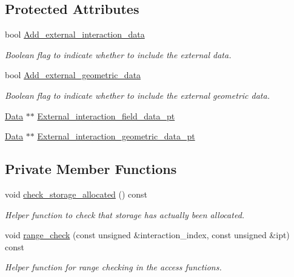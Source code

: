 \subsection*{Protected Attributes}
\begin{DoxyCompactItemize}
\item 
bool \hyperlink{classoomph_1_1ElementWithExternalElement_aba9cc26e0c5dfca9f3b39e7b7105d079}{Add\+\_\+external\+\_\+interaction\+\_\+data}
\begin{DoxyCompactList}\small\item\em Boolean flag to indicate whether to include the external data. \end{DoxyCompactList}\item 
bool \hyperlink{classoomph_1_1ElementWithExternalElement_a9d478d4cc42a922bac86492479c64db1}{Add\+\_\+external\+\_\+geometric\+\_\+data}
\begin{DoxyCompactList}\small\item\em Boolean flag to indicate whether to include the external geometric data. \end{DoxyCompactList}\item 
\hyperlink{classoomph_1_1Data}{Data} $\ast$$\ast$ \hyperlink{classoomph_1_1ElementWithExternalElement_a78e89193aa13a86a88c8b6b16141e194}{External\+\_\+interaction\+\_\+field\+\_\+data\+\_\+pt}
\item 
\hyperlink{classoomph_1_1Data}{Data} $\ast$$\ast$ \hyperlink{classoomph_1_1ElementWithExternalElement_ab72abfc5f23aebc3ea25083be8857c3e}{External\+\_\+interaction\+\_\+geometric\+\_\+data\+\_\+pt}
\end{DoxyCompactItemize}
\subsection*{Private Member Functions}
\begin{DoxyCompactItemize}
\item 
void \hyperlink{classoomph_1_1ElementWithExternalElement_a6fd8c3cb72d4feedeb8750d830f66222}{check\+\_\+storage\+\_\+allocated} () const
\begin{DoxyCompactList}\small\item\em Helper function to check that storage has actually been allocated. \end{DoxyCompactList}\item 
void \hyperlink{classoomph_1_1ElementWithExternalElement_a78d8fa19cbc1279a8aeb1756ce64c0df}{range\+\_\+check} (const unsigned \&interaction\+\_\+index, const unsigned \&ipt) const
\begin{DoxyCompactList}\small\item\em Helper function for range checking in the access functions. \end{DoxyCompactList}\end{DoxyCompactItemize}
